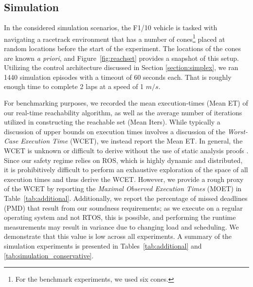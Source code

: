 \documentclass[manuscript,screen,review]{acmart}
\newcommand{\figref}[1]{Figure~\ref{#1}}
\begin{document}
\subsection{Simulation}


In the considered simulation scenarios, the F1/10 vehicle is tasked with navigating a racetrack environment that has a number of cones\footnote{For the benchmark experiments, we used six cones.} placed at random locations before the start of the experiment. The locations of the cones are known \emph{a priori}, and \figref{fig:reachset} provides a snapshot of this setup. Utilizing the control architecture discussed in Section \ref{section:simplex}, we ran 1440 simulation episodes with a timeout of 60 seconds each. That is roughly enough time to complete 2 laps at a speed of 1 $m/s$. %


For benchmarking purposes, we recorded the mean execution-times (Mean ET) of our real-time reachability algorithm, as well as the average number of iterations utilized in constructing the reachable set (Mean Iters). While typically a discussion of upper bounds on execution times involves a discussion of the \emph{Worst-Case Execution Time} (WCET), we instead report the Mean ET. In general, the WCET is unknown or difficult to derive without the use of static analysis proofs \cite{Reinhard2008}. Since our safety regime relies on ROS, which is highly dynamic and distributed, it is prohibitively difficult to perform an exhaustive exploration of the space of all execution times and thus derive the WCET.  However, we provide a rough proxy of the WCET by reporting the \emph{Maximal Observed Execution Times} (MOET) \cite{Reinhard2008} in Table~\ref{tab:additional}. Additionally, we report the percentage of missed deadlines (PMD) that result from our soundness requirements; as we execute on a regular operating system and not RTOS, this is possible, and performing the runtime measurements may result in variance due to changing load and scheduling. We demonstrate that this value is low across all experiments.
A summary of the simulation experiments is presented in Tables~\ref{tab:additional} and \ref{tab:simulation_conservative}.
\end{document}
